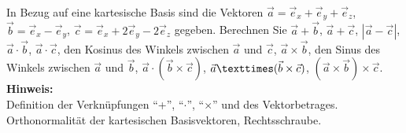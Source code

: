 \begin{question}[section=1,subsection=12,name={Elementare Vektoralgebra},difficulty=3,type=exercise,tags={20110509}]
In Bezug auf eine kartesische Basis sind die Vektoren
$\vec a = \vec e_x + \vec e_y + \vec e_z$, $\vec b = \vec e_x - \vec e_y$, $\vec c = \vec e_x + 2 \vec e_y - 2 \vec e_z$ 
gegeben. Berechnen Sie $ \vec a + \vec b$, $ \vec a + \vec c$, $| \vec a - \vec c |$, $\vec a \cdot \vec b$, $ \vec a \cdot \vec c$, den Kosinus des Winkels zwischen $\vec a$ und $\vec c$, $ \vec a \times \vec b$, den Sinus des Winkels zwischen $\vec a$ und $\vec b$, $\vec a \cdot (\vec b \times \vec c)$, $\vec a \texttimes ( \vec b \times \vec c)$, $(\vec a \times \vec b ) \times \vec c$.
\\ \textbf{Hinweis:}\\
Definition der Verkn\"upfungen ``+'', ``$\cdot$'', ``$\times$''  und des Vektorbetrages. Orthonormalit\"at der kartesischen Basisvektoren, Rechtsschraube.
\end{question}
